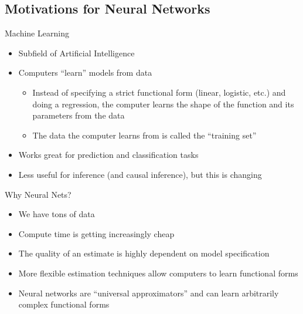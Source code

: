 \documentclass{beamer}
\begin{document}
        \subsection{Motivations for Neural Networks}

            \begin{frame}{Machine Learning}
                \begin{itemize}
                    \item<2-> Subfield of Artificial Intelligence
                    \item<3-> Computers ``learn'' models from data
                    \begin{itemize}
                        \item <4-> Instead of specifying a strict functional form (linear, logistic, etc.) and doing a regression, the computer learns the shape of the function and its parameters from the data
                        \item<5-> The data the computer learns from is called the ``training set''
                    \end{itemize}
                    \item<6-> Works great for prediction and classification tasks
                    \item<7-> Less useful for inference (and causal inference), but this is changing
                \end{itemize}
            \end{frame}
            
            \begin{frame}{Why Neural Nets?}
                \begin{itemize}
                    \item<2-> We have tons of data
                    \item<2-> Compute time is getting increasingly cheap
                    \item<3-> The quality of an estimate is highly dependent on model specification
                    \item<4-> More flexible estimation techniques allow computers to learn functional forms
                    \item<5-> Neural networks are ``universal approximators'' and can learn arbitrarily complex  functional forms
                \end{itemize}
            \end{frame}
            
\end{document}
